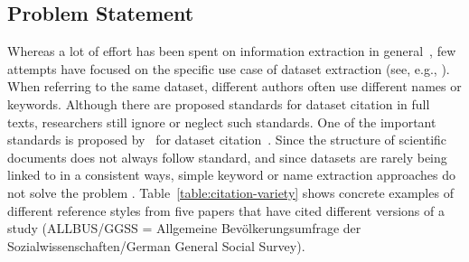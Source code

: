 \documentclass{IOS-Book-Article}
\begin{document}
\subsection{Problem Statement}
Whereas a lot of effort has been spent on information extraction in general~\citep{Sarawagi2007}, few attempts have focused on the specific use case of dataset extraction (see, e.g., \citep{MeiyuLu2012}). 
When referring to the same dataset, different authors often use different names or keywords.
Although there are proposed standards for dataset citation in full texts, researchers still ignore or neglect such standards.
One of the important standards is proposed by~\citeauthor{altman2007proposed} for dataset citation~\citeyearpar{altman2007proposed}.
Since the structure of scientific documents does not always follow standard, and since datasets are rarely being linked to in a consistent ways, simple keyword or name extraction approaches do not solve the problem \citep{Nadeau2007}. 
Table~\ref{table:citation-variety} shows concrete examples of different reference styles from five papers that have cited different versions of a study (ALLBUS/GGSS = Allgemeine Bev\"olkerungsumfrage der Sozialwissenschaften/German General Social Survey).
\end{document}
